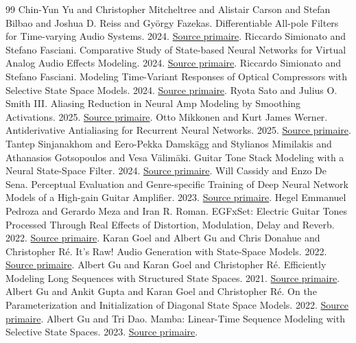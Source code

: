 \documentclass[10pt,a4paper]{article}
\begin{document}
\begin{thebibliography}{99}
Chin-Yun Yu and Christopher Mitcheltree and Alistair Carson and Stefan Bilbao and Joshua D. Reiss and Gy\"{o}rgy Fazekas. Differentiable All-pole Filters for Time-varying Audio Systems. 2024. \href{https://arxiv.org/abs/2404.07970}{Source primaire}.
Riccardo Simionato and Stefano Fasciani. Comparative Study of State-based Neural Networks for Virtual Analog Audio Effects Modeling. 2024. \href{https://arxiv.org/abs/2405.04124}{Source primaire}.
Riccardo Simionato and Stefano Fasciani. Modeling Time-Variant Responses of Optical Compressors with Selective State Space Models. 2024. \href{https://arxiv.org/abs/2408.12549}{Source primaire}.
Ryota Sato and Julius O. Smith III. Aliasing Reduction in Neural Amp Modeling by Smoothing Activations. 2025. \href{https://arxiv.org/abs/2505.04082}{Source primaire}.
Otto Mikkonen and Kurt James Werner. Antiderivative Antialiasing for Recurrent Neural Networks. 2025. \href{https://dafx.de/paper-archive/details/ZjW5x1v0V0iVtRp_jt4bzA}{Source primaire}.
Tantep Sinjanakhom and Eero-Pekka Damsk\"{a}gg and Stylianos Mimilakis and Athanasios Gotsopoulos and Vesa V\"{a}lim\"{a}ki. Guitar Tone Stack Modeling with a Neural State-Space Filter. 2024. \href{https://www.dafx.de/paper-archive/details/kXGS4_Txi3XlNEZL9ycAZg}{Source primaire}.
Will Cassidy and Enzo De Sena. Perceptual Evaluation and Genre-specific Training of Deep Neural Network Models of a High-gain Guitar Amplifier. 2023. \href{https://www.dafx.de/paper-archive/2023/DAFx23_paper_40.pdf}{Source primaire}.
Hegel Emmanuel Pedroza and Gerardo Meza and Iran R. Roman. EGFxSet: Electric Guitar Tones Processed Through Real Effects of Distortion, Modulation, Delay and Reverb. 2022. \href{https://ismir2022program.ismir.net/lbd_367.html}{Source primaire}.
Karan Goel and Albert Gu and Chris Donahue and Christopher R\'{e}. It's Raw! Audio Generation with State-Space Models. 2022. \href{https://arxiv.org/abs/2202.09729}{Source primaire}.
Albert Gu and Karan Goel and Christopher R\'{e}. Efficiently Modeling Long Sequences with Structured State Spaces. 2021. \href{https://arxiv.org/abs/2111.00396}{Source primaire}.
Albert Gu and Ankit Gupta and Karan Goel and Christopher R\'{e}. On the Parameterization and Initialization of Diagonal State Space Models. 2022. \href{https://arxiv.org/abs/2206.11893}{Source primaire}.
Albert Gu and Tri Dao. Mamba: Linear-Time Sequence Modeling with Selective State Spaces. 2023. \href{https://arxiv.org/abs/2312.00752}{Source primaire}.

\end{thebibliography}
\end{document}
